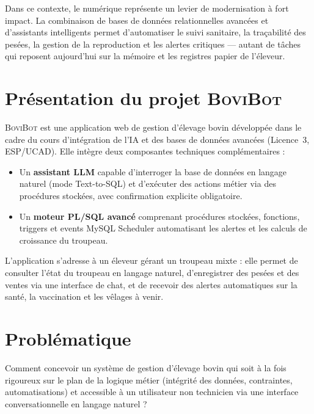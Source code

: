 \documentclass[12pt, a4paper, oneside]{report}
\newcommand{\bovibot}{\textsc{BoviBot}}
\begin{document}
\vspace{0.5em}

\noindent Dans ce contexte, le numérique représente un levier de modernisation à fort impact.
La combinaison de bases de données relationnelles avancées et d'assistants intelligents permet
d'automatiser le suivi sanitaire, la traçabilité des pesées, la gestion de la reproduction
et les alertes critiques — autant de tâches qui reposent aujourd'hui sur la mémoire et les
registres papier de l'éleveur.

\section{Présentation du projet \bovibot{}}

\bovibot{} est une application web de gestion d'élevage bovin développée dans le cadre du
cours d'intégration de l'IA et des bases de données avancées (Licence~3, ESP/UCAD). Elle
intègre deux composantes techniques complémentaires :

\begin{itemize}[itemsep=4pt]
  \item Un \textbf{assistant LLM} capable d'interroger la base de données en langage
    naturel (mode Text-to-SQL) et d'exécuter des actions métier via des procédures
    stockées, avec confirmation explicite obligatoire.
  \item Un \textbf{moteur PL/SQL avancé} comprenant procédures stockées, fonctions,
    triggers et events MySQL Scheduler automatisant les alertes et les calculs de
    croissance du troupeau.
\end{itemize}

L'application s'adresse à un éleveur gérant un troupeau mixte : elle permet de consulter
l'état du troupeau en langage naturel, d'enregistrer des pesées et des ventes via une
interface de chat, et de recevoir des alertes automatiques sur la santé, la vaccination et
les vêlages à venir.

\section{Problématique}

\begin{infobox}
  Comment concevoir un système de gestion d'élevage bovin qui soit à la fois rigoureux
  sur le plan de la logique métier (intégrité des données, contraintes, automatisations)
  et accessible à un utilisateur non technicien via une interface conversationnelle
  en langage naturel ?
\end{infobox}
\end{document}
